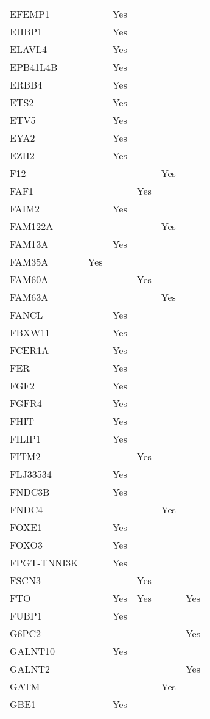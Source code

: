 \documentclass[twoside,openright]{report}
\begin{document}
\begin{appendices}
\begin{longtable}[t]{llllll}
EFEMP1 &  & Yes &  &  & \\
EHBP1 &  & Yes &  &  & \\
ELAVL4 &  & Yes &  &  & \\
EPB41L4B &  & Yes &  &  & \\
ERBB4 &  & Yes &  &  & \\
ETS2 &  & Yes &  &  & \\
ETV5 &  & Yes &  &  & \\
EYA2 &  & Yes &  &  & \\
EZH2 &  & Yes &  &  & \\
F12 &  &  &  & Yes & \\
FAF1 &  &  & Yes &  & \\
FAIM2 &  & Yes &  &  & \\
FAM122A &  &  &  & Yes & \\
FAM13A &  & Yes &  &  & \\
FAM35A & Yes &  &  &  & \\
FAM60A &  &  & Yes &  & \\
FAM63A &  &  &  & Yes & \\
FANCL &  & Yes &  &  & \\
FBXW11 &  & Yes &  &  & \\
FCER1A &  & Yes &  &  & \\
FER &  & Yes &  &  & \\
FGF2 &  & Yes &  &  & \\
FGFR4 &  & Yes &  &  & \\
FHIT &  & Yes &  &  & \\
FILIP1 &  & Yes &  &  & \\
FITM2 &  &  & Yes &  & \\
FLJ33534 &  & Yes &  &  & \\
FNDC3B &  & Yes &  &  & \\
FNDC4 &  &  &  & Yes & \\
FOXE1 &  & Yes &  &  & \\
FOXO3 &  & Yes &  &  & \\
FPGT-TNNI3K &  & Yes &  &  & \\
FSCN3 &  &  & Yes &  & \\
FTO &  & Yes & Yes &  & Yes\\
FUBP1 &  & Yes &  &  & \\
G6PC2 &  &  &  &  & Yes\\
GALNT10 &  & Yes &  &  & \\
GALNT2 &  &  &  &  & Yes\\
GATM &  &  &  & Yes & \\
GBE1 &  & Yes &  &  & \\

\end{longtable}
\end{appendices}
\end{document}
